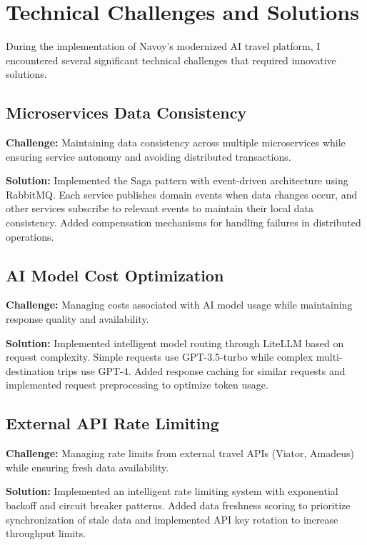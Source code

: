 \section{Technical Challenges and Solutions}
During the implementation of Navoy's modernized AI travel platform, I encountered several significant technical challenges that required innovative solutions.

\subsection{Microservices Data Consistency}
\textbf{Challenge:} Maintaining data consistency across multiple microservices while ensuring service autonomy and avoiding distributed transactions.

\textbf{Solution:} Implemented the Saga pattern with event-driven architecture using RabbitMQ. Each service publishes domain events when data changes occur, and other services subscribe to relevant events to maintain their local data consistency. Added compensation mechanisms for handling failures in distributed operations.

\subsection{AI Model Cost Optimization}
\textbf{Challenge:} Managing costs associated with AI model usage while maintaining response quality and availability.

\textbf{Solution:} Implemented intelligent model routing through LiteLLM based on request complexity. Simple requests use GPT-3.5-turbo while complex multi-destination trips use GPT-4. Added response caching for similar requests and implemented request preprocessing to optimize token usage.

\subsection{External API Rate Limiting}
\textbf{Challenge:} Managing rate limits from external travel APIs (Viator, Amadeus) while ensuring fresh data availability.

\textbf{Solution:} Implemented an intelligent rate limiting system with exponential backoff and circuit breaker patterns. Added data freshness scoring to prioritize synchronization of stale data and implemented API key rotation to increase throughput limits.

